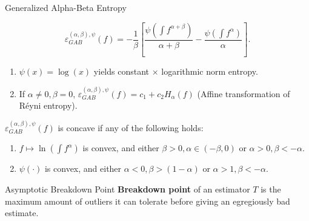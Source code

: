 \documentclass[10pt]{beamer}
\begin{document}
\begin{frame}{Generalized Alpha-Beta Entropy}
   \begin{definition}
       \begin{equation*}
           \varepsilon_{GAB}^{(\alpha,\beta),\psi}(f) = -\frac{1}{\beta}\left[ \frac{\psi(\int f^{\alpha+\beta})}{\alpha+\beta} - \frac{\psi(\int f^\alpha)}{\alpha} \right].
       \end{equation*}
   \end{definition}
   \pause
   \begin{enumerate}
       \item $\psi(x) = \log(x)$ yields constant $\times$ logarithmic norm entropy.
       \item If $\alpha \neq 0, \beta = 0$, $\varepsilon_{GAB}^{(\alpha,\beta),\psi}(f) = c_1 + c_2 H_\alpha(f)$ (Affine transformation of R\'{e}yni entropy).
   \end{enumerate}
   \pause
   \begin{theorem}[Concavity]
       $\varepsilon_{GAB}^{(\alpha,\beta),\psi}(f)$ is concave if any of the following holds:
       \begin{enumerate}
           \item $f\mapsto \ln(\int f^\alpha)$ is convex, and either $\beta > 0, \alpha \in (-\beta, 0)$ or $\alpha > 0, \beta < -\alpha$.
           \item $\psi(\cdot)$ is convex, and either $\alpha < 0, \beta > (1-\alpha)$ or $\alpha > 1, \beta < -\alpha$.
       \end{enumerate}
   \end{theorem}
\end{frame}

\begin{frame}{Asymptotic Breakdown Point}
    \textbf{Breakdown point} of an estimator $T$ is the maximum amount of outliers it can tolerate before giving an egregiously bad estimate.\\
    \vspace*{0.5cm}

\end{frame}
\end{document}
